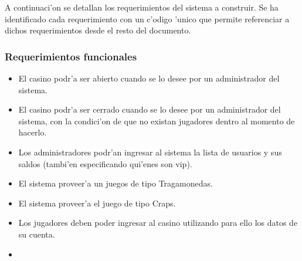 A continuaci'on se detallan los requerimientos del sistema a construir. Se ha identificado cada requerimiento con un c'odigo 'unico que permite referenciar a dichos requerimientos desde el resto del documento.

\subsubsection{Requerimientos funcionales}



\begin{itemize}

\item  {} 

 El casino podr'a ser abierto cuando se lo desee por un administrador del sistema. 

\item  {} 

 El casino podr'a ser cerrado cuando se lo desee por un administrador del sistema, con la condici'on de que no existan jugadores dentro al momento de hacerlo.

\item  {} 

 Los administradores podr'an ingresar al sistema la lista de usuarios y sus saldos (tambi'en especificando qui'enes son vip).

\item  {} 

El sistema proveer'a un juegos de tipo Tragamonedas.

\item  {}

 El sistema proveer'a el juego de tipo Craps.

\item  {}

 Los jugadores deben poder ingresar al casino utilizando para ello los datos de su cuenta.

\item  {}


\end{itemize}
